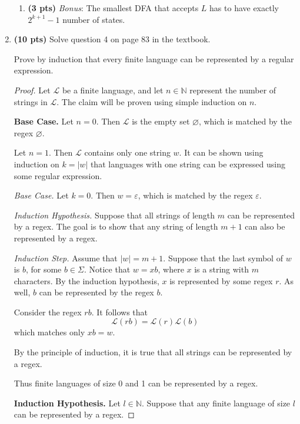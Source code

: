 \documentclass[11pt]{article}
\begin{document}
\begin{enumerate}[label=\textbf{Q\arabic*.}]
\begin{enumerate}[label=\textit{\alph*)}]
\item \textbf{(3 pts)} \textit{Bonus}: The smallest DFA that accepts $L$ has to have exactly $2^{k+1}-1$ number of states.
\end{enumerate}

\item \textbf{(10 pts)} Solve question 4 on page 83 in the textbook.

Prove by induction that every finite language can be represented by a regular expression.
\begin{proof}
	Let \(\mathcal{L}\) be a finite language, and let \(n \in \mathbb{N}\) represent the number of strings in \(\mathcal{L}\). The claim will be proven using simple induction on \(n\).

	\textbf{Base Case.} Let \(n = 0\). Then \(\mathcal{L}\) is the empty set \(\varnothing\), which is matched by the regex \(\varnothing\).

	Let \(n=1\). Then \(\mathcal{L}\) contains only one string \(w\). It can be shown using induction on \(k=|w|\) that languages with one string can be expressed using some regular expression.

	\textit{Base Case.} Let \(k=0\). Then \(w = \varepsilon\), which is matched by the regex \(\varepsilon\).

	\textit{Induction Hypothesis.} Suppose that all strings of length \(m\) can be represented by a regex. The goal is to show that any string of length \(m+1\) can also be represented by a regex.

	\textit{Induction Step.} Assume that \(|w| = m+1\). Suppose that the last symbol of \(w\) is \(b\), for some \(b \in \Sigma\). Notice that \(w = xb\), where \(x\) is a string with \(m\) characters. By the induction hypothesis, \(x\) is represented by some regex \(r\). As well, \(b\) can be represented by the regex \(b\).

	Consider the regex \(rb\). It follows that
	\[
		\mathcal{L} (rb) = \mathcal{L} (r) \mathcal{L} (b)
	\]
	which matches only \(xb = w\).

	By the principle of induction, it is true that all strings can be represented by a regex.

	Thus finite languages of size 0 and 1 can be represented by a regex.

	\textbf{Induction Hypothesis.} Let \(l \in \mathbb{N}\). Suppose that any finite language of size \(l\) can be represented by a regex.


\end{proof}
\end{enumerate}
\end{document}
